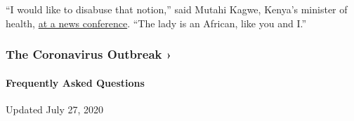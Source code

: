 ``I would like to disabuse that notion,'' said Mutahi Kagwe, Kenya's
minister of health,
\href{https://www.msn.com/en-nz/news/world/kenya-confirms-first-case-of-coronavirus-in-east-africa/ar-BB118ONC?ocid=st2}{at
a news conference}. ``The lady is an African, like you and I.''

\href{https://www.nytimes.com/news-event/coronavirus?action=click\&pgtype=Article\&state=default\&region=MAIN_CONTENT_3\&context=storylines_faq}{}

\hypertarget{the-coronavirus-outbreak-}{%
\subsubsection{The Coronavirus Outbreak
›}\label{the-coronavirus-outbreak-}}

\hypertarget{frequently-asked-questions}{%
\paragraph{Frequently Asked
Questions}\label{frequently-asked-questions}}

Updated July 27, 2020


